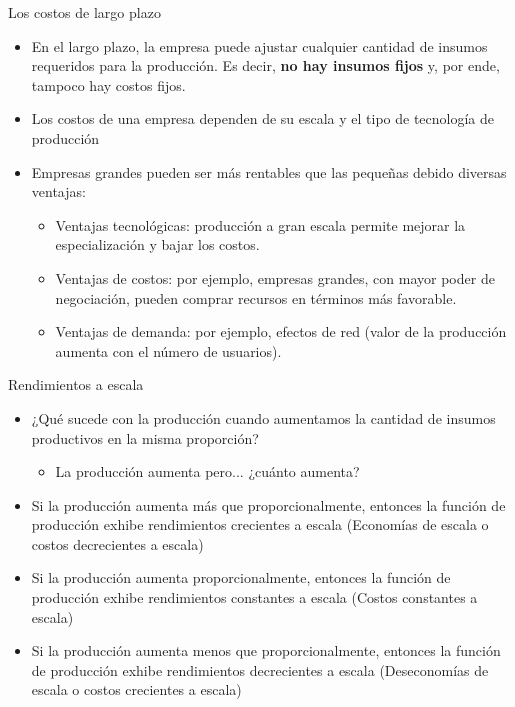 \documentclass{beamer}
\begin{document}
\begin{frame}{Los costos de largo plazo}
\begin{itemize}
    \item En el largo plazo, la empresa puede ajustar cualquier cantidad de insumos requeridos para la producción. Es decir, \textbf{no hay insumos fijos} y, por ende, tampoco hay costos fijos. 
    \item Los costos de una empresa dependen de su escala y el tipo de tecnología de producción
    \item Empresas grandes pueden ser más rentables que las pequeñas debido diversas ventajas:
    \begin{itemize}
        \item Ventajas tecnológicas: producción a gran escala permite mejorar la especialización y bajar los costos.
        \item Ventajas de costos: por ejemplo, empresas grandes, con mayor poder de negociación, pueden comprar recursos en términos más favorable.
        \item Ventajas de demanda: por ejemplo, efectos de red (valor de la producción aumenta con el número de usuarios).
    \end{itemize}
\end{itemize}
\end{frame}

\begin{frame}{Rendimientos a escala}
\begin{itemize}
    \item ¿Qué sucede con la producción cuando aumentamos la cantidad de insumos productivos en la misma proporción?
    \begin{itemize}
        \item La producción aumenta pero... ¿cuánto aumenta?
    \end{itemize}
    \item Si la producción aumenta más que proporcionalmente, entonces la función de producción exhibe rendimientos crecientes a escala (Economías de escala o costos decrecientes a escala)
    \item Si la producción aumenta proporcionalmente, entonces la función de producción exhibe rendimientos constantes a escala (Costos constantes a escala)
    \item Si la producción aumenta menos que proporcionalmente, entonces la función de producción exhibe rendimientos decrecientes a escala (Deseconomías de escala o costos crecientes a escala)
\end{itemize}
\end{frame}
\end{document}
